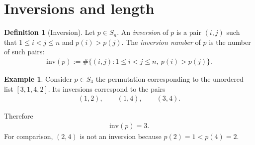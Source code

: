 \documentclass[reqno,11pt]{amsart}
\theoremstyle{definition}
\newtheorem{define}{Definition}[section]
\newtheorem{example}{Example}[section]
\theoremstyle{plain}
\theoremstyle{remark}
\numberwithin{equation}{section}
\newcommand{\be}{\begin{eqnarray}}
\newcommand{\ee}{\end{eqnarray}}
\begin{document}
\section{Inversions and length}

\newcommand{\inv}{\mathrm{inv}}
\begin{define}[Inversion]
Let $p\in S_n$. An \emph{inversion} of $p$ is a pair $(i,j)$ such that
$1\leq i<j\leq n$ and $p(i)>p(j)$. The \emph{inversion number} of $p$ is
the number of such pairs:
\be
\inv(p):=\#\bigl\{(i,j):1\leq i<j\leq n,\ p(i)>p(j)\bigr\}.
\ee
\end{define}

\begin{example}
Consider $p \in S_4$ the permutation corresponding to the unordered list $[3,1,4,2]$. Its inversions correspond to the pairs
\be
(1,2),\qquad (1,4),\qquad (3,4).
\ee

Therefore
\be
\inv(p)=3.
\ee
For comparison, $(2,4)$ is not an inversion because $p(2)=1<p(4)=2$.
\end{example}
\end{document}
